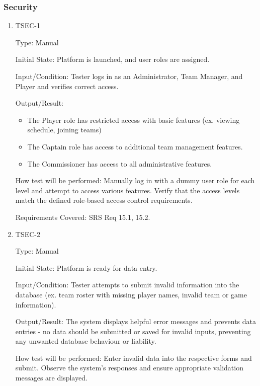 \documentclass[12pt, titlepage]{article}
\begin{document}
\subsubsection{Security}

\begin{enumerate}

\item{TSEC-1\\}

Type: Manual

Initial State: Platform is launched, and user roles are assigned.

Input/Condition: Tester logs in as an Administrator, Team Manager, and Player and verifies correct access.

Output/Result:

\begin{itemize}
\item{The Player role has restricted access with basic features (ex. viewing schedule, joining teams)}
\item{The Captain role has access to additional team management features.}
\item{The Commissioner has access to all administrative features.}

\end{itemize} 

How test will be performed: Manually log in with a dummy user role for each level and attempt to access various features. Verify that the access levels match the defined role-based access control requirements.

Requirements Covered: SRS Req 15.1, 15.2.

\item{TSEC-2\\}

Type: Manual

Initial State: Platform is ready for data entry.

Input/Condition: Tester attempts to submit invalid information into the database (ex. team roster with missing player names, invalid team or game information).

Output/Result: The system displays helpful error messages and prevents data entries - no data should be submitted or saved for invalid inputs, preventing any unwanted database behaviour or liability.

How test will be performed: Enter invalid data into the respective forms and submit. Observe the system's responses and ensure appropriate validation messages are displayed.


\end{enumerate}
\end{document}
